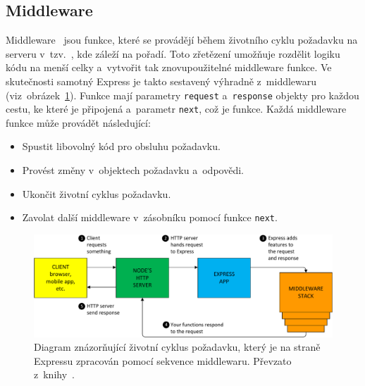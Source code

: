 \subsection{Middleware}
Middleware~\cite{book:WebDevNodeAndExpress, book:ExpressInAction} jsou funkce, které se provádějí během životního cyklu požadavku na serveru v~tzv.~\emph{}, kde záleží na pořadí. Toto zřetězení umožňuje rozdělit logiku kódu na menší celky a~vytvořit tak znovupoužitelné middleware funkce. Ve skutečnosti samotný Express je takto sestavený výhradně z~middlewaru (viz~obrázek~\ref{img:ExpressMiddleware}). Funkce mají parametry \texttt{request} a~\texttt{response} objekty pro každou cestu, ke které je připojená a~parametr \texttt{next}, což je funkce. Každá middleware funkce může provádět následující:

\begin{itemize}
    \item Spustit libovolný kód pro obsluhu požadavku.
    \item Provést změny v~objektech požadavku a~odpovědi.
    \item Ukončit životní cyklus požadavku.
    \item Zavolat další middleware v~zásobníku pomocí funkce \texttt{next}.
\end{itemize}

\begin{figure}[hbt]
	\centering
	\setlength{\fboxsep}{0pt}
	\includegraphics[width=1.0\textwidth]{obrazky-figures/ExpressRequestLifecycle.pdf}
	\caption{Diagram znázorňující životní cyklus požadavku, který je na straně Expressu zpracován pomocí sekvence middlewaru. Převzato z~knihy~\cite{book:ExpressInAction}.}
	\label{img:ExpressMiddleware}
\end{figure}

